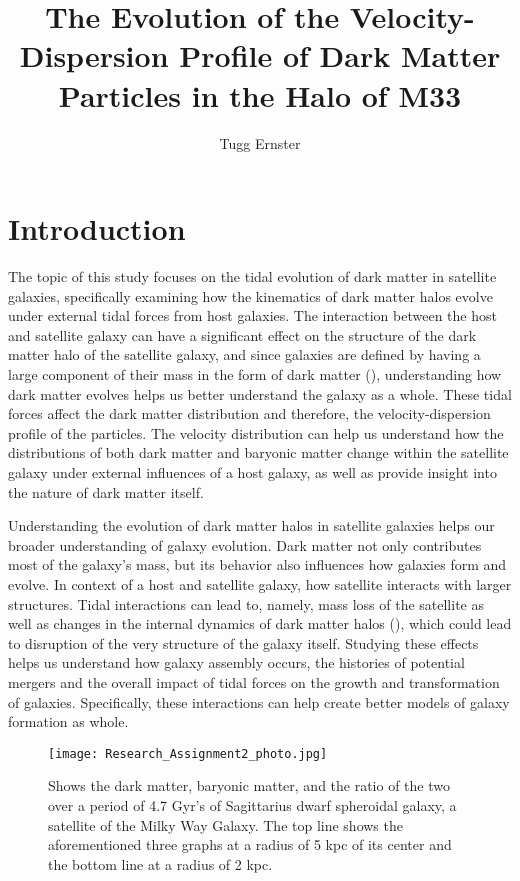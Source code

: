 \documentclass{aastex7}
\begin{document}
\title{The Evolution of the Velocity-Dispersion Profile of Dark Matter Particles in the Halo of M33}

\author{Tugg Ernster}

\section{Introduction}
The topic of this study focuses on the tidal evolution of dark matter in satellite galaxies, specifically examining how the kinematics of dark matter halos evolve under external tidal forces from host galaxies. The interaction between the host and satellite galaxy can have a significant effect on the structure of the dark matter halo of the satellite galaxy, and since galaxies are defined by having a large component of their mass in the form of dark matter (\cite{FrenkWhite_2012}), understanding how dark matter evolves helps us better understand the galaxy as a whole. These tidal forces affect the dark matter distribution and therefore, the velocity-dispersion profile of the particles. The velocity distribution can help us understand how the distributions of both dark matter and baryonic matter change within the satellite galaxy under external influences of a host galaxy, as well as provide insight into the nature of dark matter itself.

Understanding the evolution of dark matter halos in satellite galaxies helps our broader understanding of galaxy evolution. Dark matter not only contributes most of the galaxy's mass, but its behavior also influences how galaxies form and evolve. In context of a host and satellite galaxy, how satellite interacts with larger structures. Tidal interactions can lead to, namely, mass loss of the satellite as well as changes in the internal dynamics of dark matter halos (\cite{Wolf_2010}), which could lead to disruption of the very structure of the galaxy itself. Studying these effects helps us understand how galaxy assembly occurs, the histories of potential mergers and the overall impact of tidal forces on the growth and transformation of galaxies. Specifically, these interactions can help create better models of galaxy formation as whole. 
\begin{figure}[h]
    \centering
    \texttt{[image: Research\_Assignment2\_photo.jpg]}
    \caption{Shows the dark matter, baryonic matter, and the ratio of the two over a period of 4.7 Gyr's of Sagittarius dwarf spheroidal galaxy, a satellite of the Milky Way Galaxy. The top line shows the aforementioned three graphs at a radius of 5 kpc of its center and the bottom line at a radius of 2 kpc.  }
    \label{Figure 1}
\end{figure}
\end{document}
